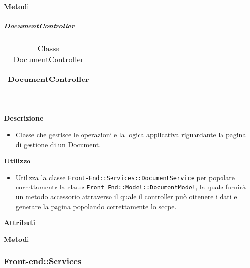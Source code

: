		\textbf{Metodi} 
	\begin{itemize}
		\end{itemize}
			\subparagraph{DocumentController} 
\begin{table}[ht]
\begin{center}
\bgroup
	\setlength{\arrayrulewidth}{0.6mm}
	\def\arraystretch{1}
		\begin{tabular}{ | p{12cm} | }
				\hline  
					\centerline{\textbf{DocumentController}}
		\\ \hline 
				\hline
				\hline
		
		\end{tabular}
\egroup
\caption{Classe DocumentController}
\end{center}
\end{table}  \textbf{\\ \\ Descrizione} 
					\begin{itemize}
						\item[] Classe che gestisce le operazioni e la logica applicativa riguardante la pagina di gestione di un Document.
					\end{itemize}      
				\textbf{Utilizzo}  
					\begin{itemize}
						\item[] Utilizza la classe \texttt{Front-End::Services::DocumentService} per popolare correttamente la classe \texttt{Front-End::Model::DocumentModel}, la quale fornirà un metodo accessorio attraverso il quale il controller può ottenere i dati e generare la pagina popolando correttamente lo scope.
					\end{itemize}
			 \textbf{Attributi} 
	\begin{itemize}
		\end{itemize}
		
		\textbf{Metodi} 
	\begin{itemize}
		\end{itemize}
	\subsubsection{Front-end::Services} 
